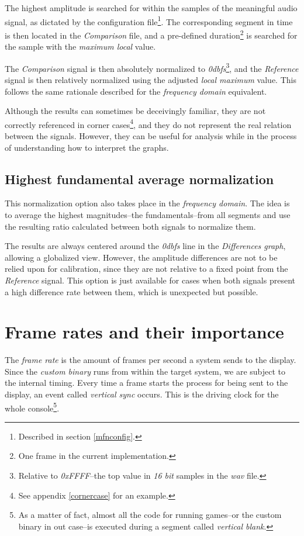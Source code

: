 \documentclass[10pt,a4paper]{report}
\newcommand{\ac}[1]{\textit{\acrshort{#1}}}
\newcommand{\db}[1]{\textit{#1\acrshort{dbfs}}}
\begin{document}
\begin{appendices}
The highest amplitude is searched for within the samples of the meaningful audio signal, as dictated by the configuration file\footnote{Described in section \ref{mfnconfig}.}. The corresponding segment in time is then located in the \textit{Comparison} file, and a pre-defined duration\footnote{One frame in the current implementation.} is searched for the sample with the \textit{maximum local} value.

The \textit{Comparison} signal is then absolutely normalized to \db{0}\footnote{Relative to \textit{0xFFFF}--the top value in \textit{16 bit} samples in the \ac{wav} file.}, and the \textit{Reference} signal is then relatively normalized using the adjusted \textit{local maximum} value. This follows the same rationale described for the \textit{frequency domain} equivalent.

Although the results can sometimes be deceivingly familiar, they are not correctly referenced in corner cases\footnote{See appendix \ref{cornercase} for an example.}, and they do not represent the real relation between the signals. However, they can be useful for analysis while in the process of understanding how to interpret the graphs.

\section{Highest fundamental average normalization}

This normalization option also takes place in the \textit{frequency domain}. The idea is to average the highest magnitudes--the fundamentals--from all segments and use the resulting ratio calculated between both signals to normalize them.

The results are always centered around the \db{0} line in the \textit{Differences graph}, allowing a globalized view. However, the amplitude differences are not to be relied upon for calibration, since they are not relative to a fixed point from the \textit{Reference} signal. This option is just available for cases when both signals present a high difference rate between them, which is unexpected but possible.

\chapter{Frame rates and their importance}
\label{framerate}

The \textit{frame rate} is the amount of frames per second a system sends to the display. Since the \textit{custom binary} runs from within the target system, we are subject to the internal timing. Every time a frame starts the process for being sent to the display, an event called \textit{vertical sync} occurs. This is the driving clock for the whole console\footnote{As a matter of fact, almost all the code for running games--or the custom binary in out case--is executed during a segment called \textit{vertical blank}.}.


\end{appendices}
\end{document}
